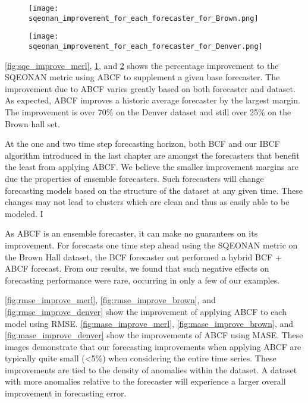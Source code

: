 \begin{figure}[!h]
	\begin{center}
		\texttt{[image: sqeonan\_improvement\_for\_each\_forecaster\_for\_Brown.png]}
	\end{center}
	\caption{}
	\label{fig:sqe_improve_brown}
\end{figure}

\begin{figure}[!h]
	\begin{center}
		\texttt{[image: sqeonan\_improvement\_for\_each\_forecaster\_for\_Denver.png]}
	\end{center}
	\caption{}
	\label{fig:sqe_improve_denver}
\end{figure}


\ref{fig:sqe_improve_merl}, \ref{fig:sqe_improve_brown}, and \ref{fig:sqe_improve_denver} shows the percentage improvement to the SQEONAN metric using ABCF to supplement a given base forecaster.  The improvement due to ABCF varies greatly based on both forecaster and dataset.  As expected, ABCF improves a historic average forecaster by the largest margin.  The improvement is over 70\% on the Denver dataset and still over 25\% on the Brown hall set.

At the one and two time step forecasting horizon, both BCF and our IBCF algorithm introduced in the last chapter are amongst the forecasters that benefit the least from applying ABCF.  We believe the smaller improvement margins are due the properties of ensemble forecasters.  Such forecasters will change forecasting models based on the structure of the dataset at any given time.  These changes may not lead to clusters which are clean and thus as easily able to be modeled.  I

As ABCF is an ensemble forecaster, it can make no guarantees on its improvement.  For forecasts one time step ahead using the SQEONAN metric on the Brown Hall dataset, the BCF forecaster out performed a hybrid BCF + ABCF forecast.  From our results, we found that such negative effects on forecasting performance were rare, occurring in only a few of our examples.

\ref{fig:rmse_improve_merl}, \ref{fig:rmse_improve_brown}, and \ref{fig:rmse_improve_denver} show the improvement of applying ABCF to each model using RMSE. \ref{fig:mase_improve_merl}, \ref{fig:mase_improve_brown}, and \ref{fig:mase_improve_denver} show the improvements of ABCF using MASE.  These images demonstrate that our forecasting improvements when applying ABCF are typically quite small (<5\%) when considering the entire time series.  These improvements are tied to the density of anomalies within the dataset.  A dataset with more anomalies relative to the forecaster will experience a larger overall improvement in forecasting error.

